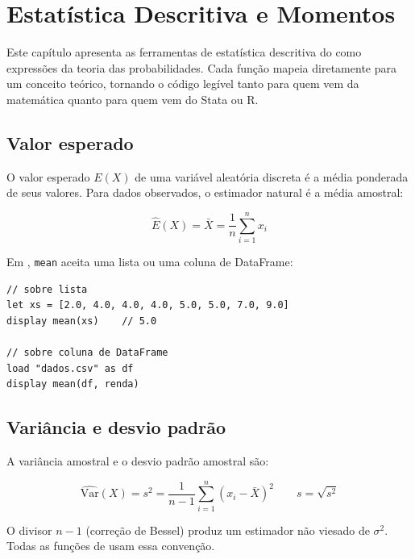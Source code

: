 \chapter{Estatística Descritiva e Momentos}
\label{cap:probabilidade}

Este capítulo apresenta as ferramentas de estatística descritiva do \hayashi{}
como expressões da teoria das probabilidades. Cada função mapeia diretamente
para um conceito teórico, tornando o código legível tanto para quem vem da
matemática quanto para quem vem do Stata ou R.

\section{Valor esperado}

O valor esperado $E(X)$ de uma variável aleatória discreta é a média ponderada
de seus valores. Para dados observados, o estimador natural é a média amostral:

\[
  \hat{E}(X) = \bar{X} = \frac{1}{n}\sum_{i=1}^{n} x_i
\]

Em \hayashi{}, \lstinline{mean} aceita uma lista ou uma coluna de DataFrame:

\begin{lstlisting}[caption={E(X) sobre lista e sobre coluna}]
// sobre lista
let xs = [2.0, 4.0, 4.0, 4.0, 5.0, 5.0, 7.0, 9.0]
display mean(xs)    // 5.0

// sobre coluna de DataFrame
load "dados.csv" as df
display mean(df, renda)
\end{lstlisting}

\section{Variância e desvio padrão}

A variância amostral e o desvio padrão amostral são:

\[
  \widehat{\mathrm{Var}}(X) = s^2 = \frac{1}{n-1}\sum_{i=1}^{n}(x_i - \bar{X})^2
  \qquad
  s = \sqrt{s^2}
\]

O divisor $n-1$ (correção de Bessel) produz um estimador não viesado de
$\sigma^2$. Todas as funções de \hayashi{} usam essa convenção.

